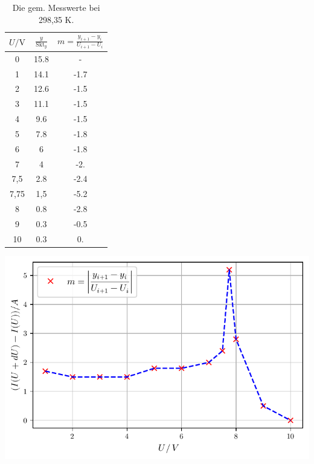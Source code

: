 \begin{table}[ht]
  \begin{minipage}[b]{0.4\linewidth}
  \centering
  \begin{tabular}{c c c}
    \toprule
    $U / \unit\V$ & $\frac{y}{\text{Skt}_y}$ & $m  =\frac{y_{i+1} - y_{i}}{U_{i+1} - U_{i}}$ \\
    \midrule 
    0   & 15.8  &  -  \\
    1   & 14.1  & -1.7\\
    2   & 12.6  & -1.5\\
    3   & 11.1  & -1.5\\
    4   & 9.6   & -1.5\\
    5   & 7.8   & -1.8\\
    6   & 6     & -1.8\\
    7   & 4     & -2. \\
    7,5 & 2.8   & -2.4\\
    7,75& 1,5   & -5.2\\
    8   & 0.8   & -2.8\\
    9   & 0.3   & -0.5\\
    10  & 0.3   & 0.  \\
    \bottomrule
  \end{tabular}
    \caption{Die gem. Messwerte bei 298,35 K.}
    \label{tab:tabelle2}
  \end{minipage}\hfill
  \begin{minipage}[b]{0.45\linewidth}
  \centering
  \includegraphics[width=\linewidth]{build/plot1.pdf}
  \label{fig:plot1}
  \end{minipage}
\end{table}

